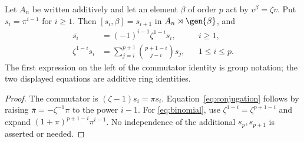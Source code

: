\begin{corollary}\label{UF.Conjugation}
Let $A_n$ be written additively and let an element $\beta$ of order
$p$ act by $v^\beta=\zeta v$. Put $s_i=\pi^{i-1}$ for $i\geq1$.
Then $[s_i,\beta]=s_{i+1}$ in $A_n\rtimes\gen{\beta}$, and
\begin{align}
 \overline{s_i}&=(-1)^{i-1}\zeta^{1-i}s_i,
       &&i\geq1,\label{eq:conjugation}\\
 \zeta^{1-i}s_i&=\sum_{j=i}^{p+1}
       \binom{p+1-i}{j-i}s_j,
       &&1\leq i\leq p.\label{eq:binomial}
\end{align}
The first expression on the left of the commutator identity is group
notation; the two displayed equations are additive ring identities.
\end{corollary}
\begin{proof}
The commutator is $(\zeta-1)s_i=\pi s_i$.
Equation~\eqref{eq:conjugation} follows by raising
$\overline\pi=-\zeta^{-1}\pi$ to the power $i-1$.
For \eqref{eq:binomial}, use $\zeta^{1-i}=\zeta^{p+1-i}$ and
expand $(1+\pi)^{p+1-i}\pi^{i-1}$. No independence of the
additional $s_p,s_{p+1}$ is asserted or needed.
\end{proof}
